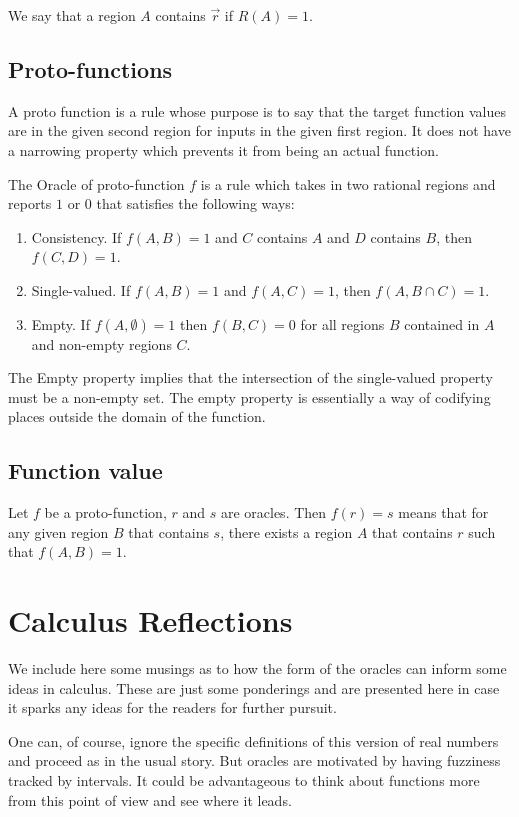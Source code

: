 \documentclass[12pt]{article}
\theoremstyle{remark}
\begin{document}
We say that a region $A$ contains $\Vec{r}$ if $R(A) = 1$.


\subsection{Proto-functions}

A proto function is a rule whose purpose is to say that the target function values are in the given second region for inputs in the given first region. It does not have a narrowing property which prevents it from being an actual function. 

The Oracle of proto-function $f$ is a rule which takes in two rational regions and reports $1$ or $0$ that satisfies the following ways: 
\begin{enumerate}
    \item Consistency. If $f(A,B) = 1$ and $C$ contains $A$ and $D$ contains $B$, then $f(C,D) = 1$.
    \item Single-valued. If $f(A,B)=1$ and $f(A,C)=1$, then $f(A, B \cap C) = 1$. 
    \item Empty. If $f(A, \emptyset) = 1$ then $f(B, C) = 0$ for all regions $B$ contained in $A$ and non-empty regions $C$.
\end{enumerate}

The Empty property implies that the intersection of the single-valued property must be a non-empty set. The empty property is essentially a way of codifying places outside the domain of the function. 

\subsection{Function value}

Let $f$ be a proto-function, $r$ and $s$ are oracles. Then $f(r) = s$ means that for any given region $B$ that contains $s$, there exists a region $A$ that contains $r$ such that $f(A,B) = 1$.



\section{Calculus Reflections}\label{app:calc}

We include here some musings as to how the form of the oracles can inform some ideas in calculus. These are just some ponderings and are presented here in case it sparks any ideas for the readers for further pursuit. 

One can, of course, ignore the specific definitions of this version of real numbers and proceed as in the usual story. But oracles are motivated by having fuzziness tracked by intervals. It could be advantageous to think about functions more from this point of view and see where it leads. 
\end{document}
